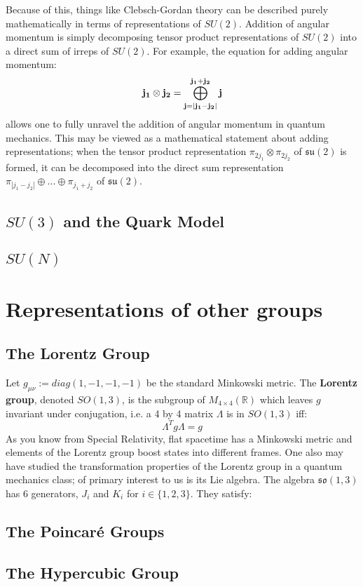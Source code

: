 \documentclass[11pt, oneside]{article}   	%
\theoremstyle{definition}
\begin{document}
Because of this, things like Clebsch-Gordan theory can be described purely mathematically in terms of representations 
of $SU(2)$. Addition of angular momentum is simply decomposing tensor product representations of $SU(2)$ into a 
direct sum of irreps of $SU(2)$. For example, the equation for adding angular momentum:
\begin{equation}
	\bf{j_1}\otimes j_2 = \bigoplus_{j = |j_1 - j_2|}^{j_1 + j_2} j
\end{equation}
allows one to fully unravel the addition of angular momentum in quantum mechanics. This may be viewed as a mathematical 
statement about adding representations; when the tensor product representation $\pi_{2j_1}\otimes\pi_{2j_2}$ of $\mathfrak{su}(2)$ 
is formed, it can be decomposed into the direct sum representation $\pi_{|j_1 - j_2|}\oplus ...\oplus\pi_{j_1 + j_2}$ of $\mathfrak{su}(2)$. 

\subsection{$SU(3)$ and the Quark Model}

\subsection{$SU(N)$}

\section{Representations of other groups}

\subsection{The Lorentz Group}

Let $g_{\mu\nu} := diag(1, -1, -1, -1)$ be the standard Minkowski metric. The \textbf{Lorentz group}, denoted $SO(1, 3)$, is the subgroup 
of $M_{4\times 4}(\mathbb R)$ which leaves $g$ invariant under conjugation, i.e. a 4 by 4 matrix $\Lambda$ is in $SO(1, 3)$ iff:
\begin{equation}
	\Lambda^T g\Lambda = g
\end{equation}
As you know from Special Relativity, flat spacetime has a Minkowski metric and elements of the Lorentz group boost states into different frames. 
One also may have studied the transformation properties of the Lorentz group in a quantum mechanics class; of primary interest to us is its 
Lie algebra. The algebra $\mathfrak{so}(1, 3)$ has 6 generators, $J_i$ and $K_i$ for $i\in\{1, 2, 3\}$. They satisfy:


\subsection{The Poincar\'{e} Groups}

\subsection{The Hypercubic Group}
\end{document}
